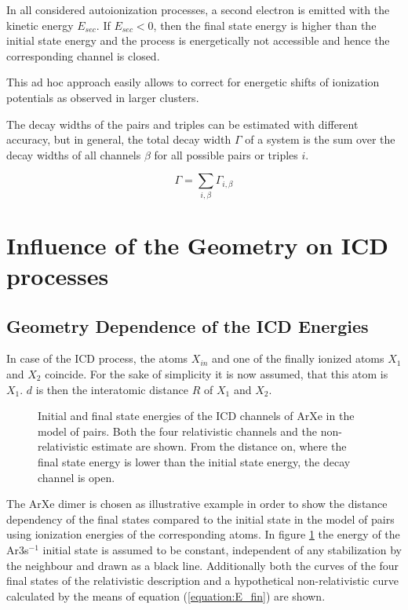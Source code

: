 In all considered autoionization processes, a second electron
is emitted with the kinetic energy $E_{sec}$. If $E_{sec}<0$, then
the final state energy is higher than the initial state energy and the
process is energetically not accessible and hence the corresponding channel
is closed.

This ad hoc approach easily allows to correct for energetic shifts of
ionization potentials as observed in larger clusters.

The decay widths of the pairs and triples can be estimated with
different accuracy, but in general, the total decay width $\Gamma$ of
a system is the sum over the decay widths of all channels $\beta$ for
all possible pairs or triples $i$.

\begin{equation}
  \Gamma = \sum\limits_{i,\beta}\Gamma_{i,\beta}
\end{equation}


\section{Influence of the Geometry on ICD processes} \label{section:icd_geom}

\subsection{Geometry Dependence of the ICD Energies}
In case of the \ac{ICD} process, the atoms $X_{in}$ and one of
the finally ionized atoms $X_1$ and $X_2$ coincide. For the sake of simplicity
it is now assumed, that this atom is $X_1$. $d$ is then the interatomic distance
$R$ of $X_1$ and $X_2$.

\begin{figure}[h]
 \centering
 
 \caption{Initial and final state energies of the ICD channels of ArXe in the
          model of pairs. Both the four relativistic channels and
          the non-relativistic estimate are shown. From the distance on, where
          the final state energy is lower than the initial state energy, the
          decay channel is open.}
 \label{figure:ArXe_energy_curves_unshifted}
\end{figure}

The ArXe dimer is chosen as illustrative example in order to show the distance
dependency of the final states compared to the initial state
in the model of pairs using
ionization energies of the corresponding atoms.
In figure \ref{figure:ArXe_energy_curves_unshifted} the energy of
the Ar3s$^{-1}$ initial
state is assumed to be constant, independent of any stabilization by the
neighbour and drawn as a black line. Additionally both the
curves of the four final states of the relativistic description and
a hypothetical non-relativistic curve calculated by the means of
equation (\ref{equation:E_fin}) are shown.

